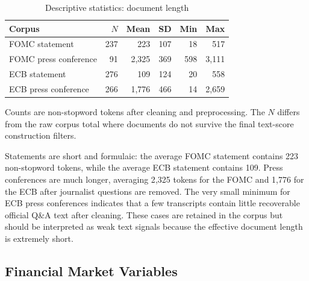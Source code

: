 \begin{table}[htbp]
\centering
\caption{Descriptive statistics: document length}
\label{tab:text_desc}
\begin{threeparttable}
\begin{tabular}{lrrrrr}
\toprule
Corpus & $N$ & Mean & SD & Min & Max \\
\midrule
FOMC statement        & 237 & 223   & 107 & 18  & 517 \\
FOMC press conference & 91  & 2{,}325 & 369 & 598 & 3{,}111 \\
ECB statement         & 276 & 109   & 124 & 20  & 558 \\
ECB press conference  & 266 & 1{,}776 & 466 & 14  & 2{,}659 \\
\bottomrule
\end{tabular}
\begin{tablenotes}\footnotesize
  \item[] Counts are non-stopword tokens after cleaning and preprocessing. The $N$
  differs from the raw corpus total where documents do not survive the final
  text-score construction filters.
\end{tablenotes}
\end{threeparttable}
\end{table}

Statements are short and formulaic: the average FOMC statement contains 223
non-stopword tokens, while the average ECB statement contains 109. Press conferences
are much longer, averaging 2{,}325 tokens for the FOMC and 1{,}776 for the ECB after
journalist questions are removed. The very small minimum for ECB press conferences
indicates that a few transcripts contain little recoverable official Q\&A text after
cleaning. These cases are retained in the corpus but should be interpreted as weak text
signals because the effective document length is extremely short.

\subsection{Financial Market Variables}
\label{sec:data_desc_market}

